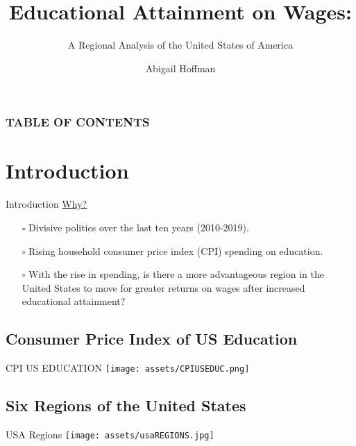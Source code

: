 \documentclass[9pt]{beamer}
\title{Educational Attainment on Wages:}
\subtitle{A Regional Analysis of the United States of America}
\author{Abigail Hoffman}
\institute{University of Oklahoma}
\begin{document}
\titlepage

\begin{frame}

 \frametitle{TABLE OF CONTENTS}
 \tableofcontents
\end{frame}

\section{Introduction} %
\begin{frame}{Introduction}%
\underline{Why?}
\begin{itemize}
 \setlength\itemsep{1em}
    \item[$\square$] Divisive politics over the last ten years (2010-2019). 
    \item[$\square$] Rising household consumer price index (CPI) spending on education. 
    \item[$\square$] With the rise in spending, is there a more advantageous region in the United States to move for greater returns on wages after increased educational attainment?
\end{itemize}
 
\end{frame}

\subsection{Consumer Price Index of US Education }
\begin{frame}{CPI US EDUCATION}
 \texttt{[image: assets/CPIUSEDUC.png]}  
\end{frame}

\subsection{Six Regions of the United States}
\begin{frame}{USA Regions}
\centering
\texttt{[image: assets/usaREGIONS.jpg]}
\end{frame}
\end{document}

